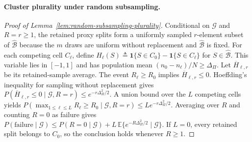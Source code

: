 \paragraph[Cluster plurality under random subsampling.]{ Cluster plurality under random subsampling.}
\begin{proof}[ Proof of Lemma~\ref{lem:random-subsampling-plurality}]
Conditional on $\mathcal G$ and $R=r\ge1$, the retained proxy splits form a uniformly sampled $r$-element subset of $\widehat{\mathcal B}$ because the $m$ draws are uniform without replacement and $\widehat{\mathcal B}$ is fixed. For each competing cell $C_\ell$, define $H_\ell(S)\triangleq\mathbf 1\{S\in C_0\}-\mathbf 1\{S\in C_\ell\}$ for $S\in\widehat{\mathcal B}$. This variable lies in $[-1,1]$ and has population mean $(n_0-n_\ell)/N\ge\Delta_\Pi$. Let $\overline H_{\ell,r}$ be its retained-sample average. The event $R_\ell\ge R_0$ implies $\overline H_{\ell,r}\le0$. Hoeffding's inequality for sampling without replacement \citep{hoeffding1963probability} gives $P(\overline H_{\ell,r}\le0\mid\mathcal G,R=r)\le e^{-r\Delta_\Pi^2/2}$. A union bound over the $L$ competing cells yields $P(\max_{1\le\ell\le L}R_\ell\ge R_0\mid\mathcal G,R=r)\le L e^{-r\Delta_\Pi^2/2}$. Averaging over $R$ and counting $R=0$ as failure gives $P(\text{failure}\mid\mathcal G)\le P(R=0\mid\mathcal G)+L\,\mathbb E\{e^{-R\Delta_\Pi^2/2}\mid\mathcal G\}$. If $L=0$, every retained split belongs to $C_0$, so the conclusion holds whenever $R\ge1$.
\end{proof}

